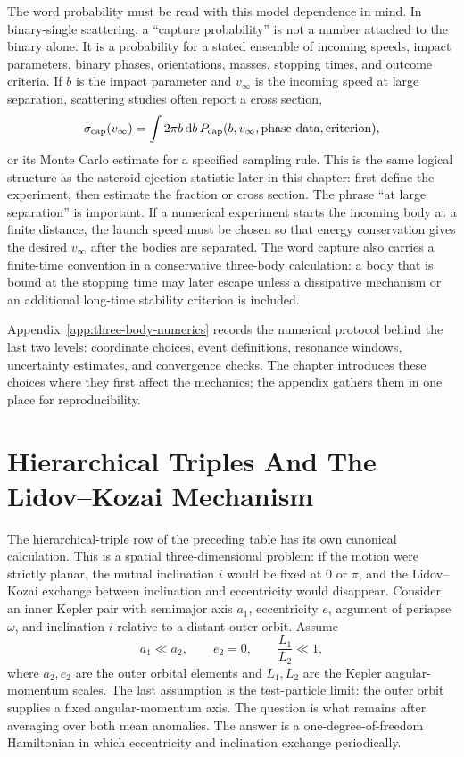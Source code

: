 The word probability must be read with this model dependence in mind.  In
binary-single scattering, a ``capture probability'' is not a number attached to
the binary alone.  It is a probability for a stated ensemble of incoming
speeds, impact parameters, binary phases, orientations, masses, stopping
times, and outcome criteria.  If \(b\) is the impact parameter and
\(v_\infty\) is the incoming speed at large separation, scattering studies
often report a cross section,
\[
  \sigma_{\rm cap}(v_\infty)
  =
  \int 2\pi b\,\mathrm{d} b\,
  P_{\rm cap}(b,v_\infty,\text{phase data},\text{criterion}),
\]
or its Monte Carlo estimate for a specified sampling rule.  This is the same
logical structure as the asteroid ejection statistic later in this chapter:
first define the experiment, then estimate the fraction or cross section.
The phrase ``at large separation'' is important.  If a numerical experiment
starts the incoming body at a finite distance, the launch speed must be chosen
so that energy conservation gives the desired \(v_\infty\) after the bodies are
separated.  The word capture also carries a finite-time convention in a
conservative three-body calculation: a body that is bound at the stopping time
may later escape unless a dissipative mechanism or an additional long-time
stability criterion is included.

Appendix~\ref{app:three-body-numerics} records the numerical protocol behind
the last two levels: coordinate choices, event definitions, resonance windows,
uncertainty estimates, and convergence checks. The chapter introduces these
choices where they first affect the mechanics; the appendix gathers them in one
place for reproducibility.

\section{Hierarchical Triples And The Lidov--Kozai Mechanism}
\label{sec:lidov-kozai-mechanism}

The hierarchical-triple row of the preceding table has its own canonical
calculation.  This is a spatial three-dimensional problem: if the motion were
strictly planar, the mutual inclination \(i\) would be fixed at \(0\) or
\(\pi\), and the Lidov--Kozai exchange between inclination and eccentricity
would disappear.  Consider an inner Kepler pair with semimajor axis \(a_1\),
eccentricity \(e\), argument of periapse \(\omega\), and inclination \(i\)
relative to a distant outer orbit.  Assume
\[
  a_1\ll a_2,
  \qquad
  e_2=0,
  \qquad
  \frac{L_1}{L_2}\ll1,
\]
where \(a_2,e_2\) are the outer orbital elements and \(L_1,L_2\) are the
Kepler angular-momentum scales.  The last assumption is the test-particle
limit: the outer orbit supplies a fixed angular-momentum axis.  The question is
what remains after averaging over both mean anomalies.  The answer is a
one-degree-of-freedom Hamiltonian in which eccentricity and inclination
exchange periodically.

